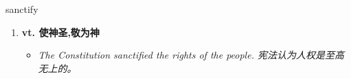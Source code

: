 
\begin{frame}
{\huge sanctify}
\begin{center}
\begin{enumerate}\Large
  \item \textbf{vt. 使神圣,敬为神}
  \begin{itemize}
    \item \em{\Large{The Constitution sanctified the rights of the people. 宪法认为人权是至高无上的。}}
  \end{itemize}
\end{enumerate}
\end{center}
\end{frame}
